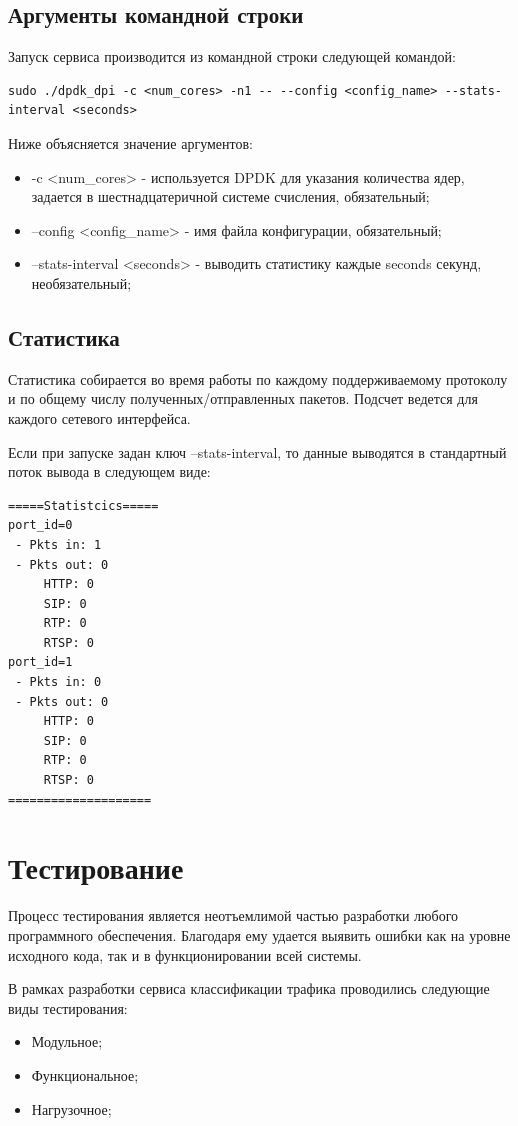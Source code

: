 \subsection{Аргументы командной строки}
Запуск сервиса производится из командной строки следующей командой:
\begin{lstlisting}
sudo ./dpdk_dpi -c <num_cores> -n1 -- --config <config_name> --stats-interval <seconds>
\end{lstlisting}
Ниже объясняется значение аргументов:
\begin{itemize}
\item -c <num\_cores> - используется DPDK для указания количества ядер, задается в шестнадцатеричной системе счисления, обязательный;
\item --config <config\_name> - имя файла конфигурации, обязательный;
\item --stats-interval <seconds> - выводить статистику каждые seconds секунд, необязательный;
\end{itemize}

\subsection{Статистика}
Статистика собирается во время работы по каждому поддерживаемому протоколу и по общему числу полученных/отправленных пакетов. Подсчет ведется для каждого сетевого интерфейса.

Если при запуске задан ключ --stats-interval, то данные выводятся в стандартный поток вывода в следующем виде:
\begin{lstlisting}
=====Statistcics=====
port_id=0
 - Pkts in: 1
 - Pkts out: 0
     HTTP: 0
     SIP: 0
     RTP: 0
     RTSP: 0
port_id=1
 - Pkts in: 0
 - Pkts out: 0
     HTTP: 0
     SIP: 0
     RTP: 0
     RTSP: 0
====================
\end{lstlisting}


\section{Тестирование}
Процесс тестирования является неотъемлимой частью разработки любого программного обеспечения. Благодаря ему удается выявить ошибки как на уровне исходного кода, так и в функционировании всей системы.

В рамках разработки сервиса классификации трафика проводились следующие виды тестирования:
\begin{itemize}
\item Модульное;
\item Функциональное;
\item Нагрузочное;
\end{itemize}


